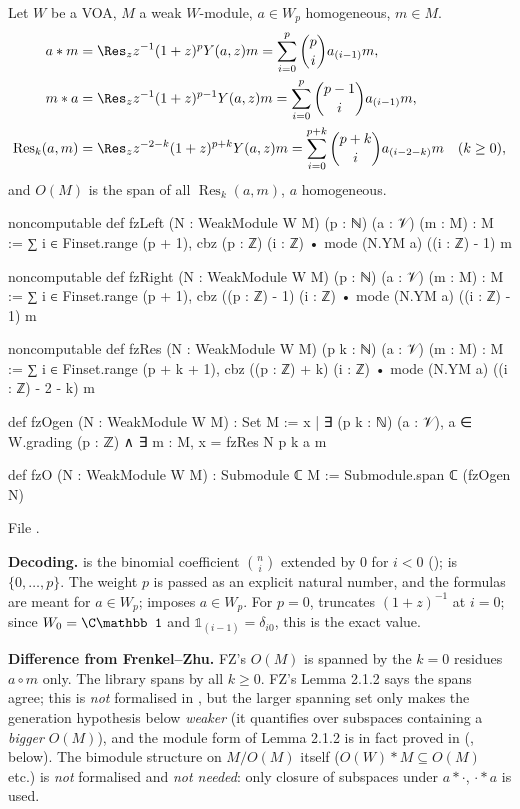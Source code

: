 \begin{definition}\label{ch14:def:fz}
Let $W$ be a VOA, $M$ a weak $W$-module, $a\in W_p$ homogeneous, $m\in M$.
\begin{align*}
 a*m&=\Res_z z^{-1}(1+z)^pY(a,z)m=\sum_{i=0}^p\binom pi a_{(i-1)}m,\\
 m*a&=\Res_z z^{-1}(1+z)^{p-1}Y(a,z)m=\sum_{i=0}^p\binom{p-1}{i}a_{(i-1)}m,\\
 \operatorname{Res}_k(a,m)&=\Res_z z^{-2-k}(1+z)^{p+k}Y(a,z)m=\sum_{i=0}^{p+k}\binom{p+k}{i}a_{(i-2-k)}m\quad(k\ge0),
\end{align*}
and $O(M)$ is the span of all $\operatorname{Res}_k(a,m)$, $a$ homogeneous.
\end{definition}
\begin{leancode}
noncomputable def fzLeft (N : WeakModule W M) (p : ℕ) (a : 𝒱) (m : M) : M :=
  ∑ i ∈ Finset.range (p + 1), cbz (p : ℤ) (i : ℤ) • mode (N.YM a) ((i : ℤ) - 1) m

noncomputable def fzRight (N : WeakModule W M) (p : ℕ) (a : 𝒱) (m : M) : M :=
  ∑ i ∈ Finset.range (p + 1), cbz ((p : ℤ) - 1) (i : ℤ) • mode (N.YM a) ((i : ℤ) - 1) m

noncomputable def fzRes (N : WeakModule W M) (p k : ℕ) (a : 𝒱) (m : M) : M :=
  ∑ i ∈ Finset.range (p + k + 1), cbz ((p : ℤ) + k) (i : ℤ) • mode (N.YM a) ((i : ℤ) - 2 - k) m

def fzOgen (N : WeakModule W M) : Set M :=
  {x | ∃ (p k : ℕ) (a : 𝒱), a ∈ W.grading (p : ℤ) ∧ ∃ m : M, x = fzRes N p k a m}

def fzO (N : WeakModule W M) : Submodule ℂ M := Submodule.span ℂ (fzOgen N)
\end{leancode}
File .

\begin{dictionary}
\textbf{Decoding.}   is the binomial coefficient $\binom ni$ extended by $0$ for $i<0$
();  is $\{0,\dots,p\}$.  The weight $p$ is passed as an
explicit natural number, and the formulas are meant for $a\in W_p$;  imposes $a\in W_p$.
For $p=0$,  truncates $(1+z)^{-1}$ at $i=0$; since $W_0=\C\mathbb 1$ and
$\mathbb 1_{(i-1)}=\delta_{i0}$, this is the exact value.

\textbf{Difference from Frenkel--Zhu.}  FZ's $O(M)$ is spanned by the $k=0$ residues $a\circ m$ only.
The library spans by all $k\ge0$.  FZ's Lemma 2.1.2 says the spans agree; this is \emph{not} formalised in
, but the larger spanning set only makes the generation hypothesis below
\emph{weaker} (it quantifies over subspaces containing a \emph{bigger} $O(M)$), and the module form of
Lemma 2.1.2 is in fact proved in  (, below).  The bimodule
structure on $M/O(M)$ itself ($O(W)*M\subseteq O(M)$ etc.) is \emph{not} formalised and \emph{not
needed}: only closure of subspaces under $a*\cdot$, $\cdot*a$ is used.
\end{dictionary}

